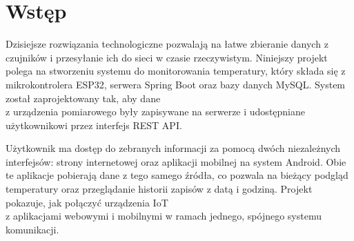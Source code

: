 \chapter*{Wstęp}

Dzisiejsze rozwiązania technologiczne pozwalają na łatwe zbieranie danych z czujników i przesyłanie ich do sieci w czasie rzeczywistym. Niniejszy projekt polega na stworzeniu systemu do monitorowania temperatury, który składa się z mikrokontrolera ESP32, serwera Spring Boot oraz bazy danych MySQL. System został zaprojektowany tak, aby dane \\ z urządzenia pomiarowego były zapisywane na serwerze i udostępniane użytkownikowi przez interfejs REST API.

Użytkownik ma dostęp do zebranych informacji za pomocą dwóch niezależnych interfejsów: strony internetowej oraz aplikacji mobilnej na system Android. Obie te aplikacje pobierają dane z tego samego źródła, co pozwala na bieżący podgląd temperatury oraz przeglądanie historii zapisów z datą i godziną. Projekt pokazuje, jak połączyć urządzenia IoT \\ z aplikacjami webowymi i mobilnymi w ramach jednego, spójnego systemu komunikacji.
